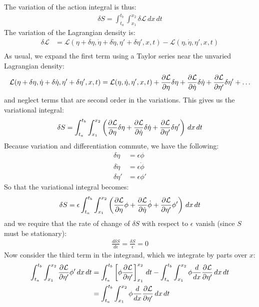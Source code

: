 The variation of the action integral is thus:
\begin{align}
\delta S=\int_{t_a}^{t_b} \int_{x_1}^{x_2}\delta\mathcal{L}\,dx\,dt
\end{align}
The variation of the Lagrangian density is:
\begin{align}
\delta\mathcal{L}&=\mathcal{L}(\eta+\delta\eta,\dot\eta+\delta\dot\eta,\eta'+\delta\eta',x,t)-\mathcal{L}(\eta,\dot\eta,\eta',x,t)\nonumber\\
\end{align}
As usual, we expand the first term using a Taylor series near the unvaried Lagrangian density:
\begin{align}
\mathcal{L}(\eta+\delta\eta,\dot\eta+\delta\dot\eta,\eta'+\delta\eta',x,t)=\mathcal{L}(\eta,\dot\eta,\eta',x,t)+\frac{\partial \mathcal{L}}{\partial \eta}\delta\eta+\frac{\partial \mathcal{L}}{\partial \dot\eta}\delta\dot\eta+\frac{\partial \mathcal{L}}{\partial \eta'}\delta\eta'+\dots
\end{align}
and neglect terms that are second order in the variations. This gives us the variational integral:
\begin{align}
\delta S=\int_{t_a}^{t_b} \int_{x_1}^{x_2} \left(\frac{\partial \mathcal{L}}{\partial \eta}\delta\eta+\frac{\partial \mathcal{L}}{\partial \dot\eta}\delta\dot\eta+\frac{\partial \mathcal{L}}{\partial \eta'}\delta\eta'  \right)\,dx\,dt
\end{align}
Because variation and differentiation commute, we have the following:
\begin{align}
\delta \eta &=\epsilon \phi\nonumber\\
\delta \dot\eta &=\epsilon\dot\phi\nonumber\\
\delta \eta' &=\epsilon \phi'
\end{align}
So that the variational integral becomes:
\begin{align}
\delta S=\epsilon\int_{t_a}^{t_b} \int_{x_1}^{x_2} \left(\frac{\partial \mathcal{L}}{\partial \eta}\phi+\frac{\partial \mathcal{L}}{\partial \dot\eta}\dot\phi+\frac{\partial \mathcal{L}}{\partial \eta'}\phi'  \right)\,dx\,dt
\end{align}
and we require that the rate of change of $\delta S$ with respect to $\epsilon$ vanish (since $S$ must be stationary):
\begin{align}
\frac{d\delta S}{d\epsilon}=\frac{\delta S}{\epsilon}=0
\end{align}
Now consider the third term in the integrand, which we integrate by parts over $x$:
\begin{align}
\int_{t_a}^{t_b} \int_{x_1}^{x_2}\frac{\partial \mathcal{L}}{\partial \eta'}\phi' \,dx\,dt&=\int_{t_a}^{t_b}\left[\phi\frac{\partial \mathcal{L}}{\partial \eta'}\right]_{x_1}^{x_2}\,dt-\int_{t_a}^{t_b} \int_{x_1}^{x_2}\phi\frac{d}{dx}\frac{\partial \mathcal{L}}{\partial \eta'}\,dx\,dt\nonumber\\
&=\int_{t_a}^{t_b} \int_{x_1}^{x_2}\phi\frac{d}{dx}\frac{\partial \mathcal{L}}{\partial \eta'}\,dx\,dt
\end{align}
